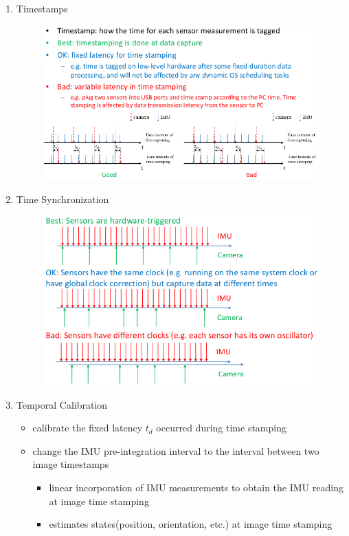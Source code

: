 \documentclass[12pt,a4paper]{article}
\begin{document}
\begin{enumerate}


\item Timestamps

\begin{figure}[htbp]
\centering
\includegraphics[scale=0.6]{images/timestamps.png}
\end{figure}

\item Time Synchronization

\begin{figure}[htbp]
\centering
\includegraphics[scale=0.6]{images/time_synchronization.png}
\end{figure}

\item Temporal Calibration

\begin{itemize}
\item calibrate the fixed latency $t_d$ occurred during time stamping
\item change the IMU pre-integration interval to the interval between two image timestamps
  \begin{itemize}
  \item linear incorporation of IMU measurements to obtain the IMU reading at image time stamping
  \item estimates states(position, orientation, etc.) at image time stamping
  \end{itemize}
\end{itemize}


\end{enumerate}
\end{document}
